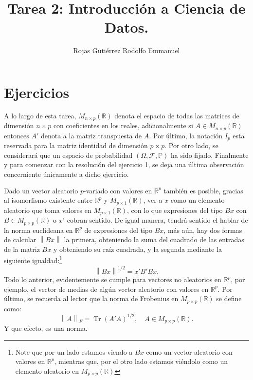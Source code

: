 \documentclass[10.5pt,notitlepage]{article}
\title{Tarea 2: Introducción a Ciencia de Datos.}
\author{Rojas Gutiérrez Rodolfo Emmanuel}
\renewcommand{\qedsymbol}{$\blacksquare$}
\DeclareMathOperator{\Tr}{Tr}
\newcommand{\PP}{\mathbb{P}}
\newcommand{\RR}{\mathbb{R}}
\newcommand{\Ff}{\mathcal{F}}
\newcommand{\norm}[1]{\left\| #1 \right\|}
\theoremstyle{plain}
\newenvironment{rem}
  {\pushQED{\qed}\renewcommand{\qedsymbol}{$\triangle$}\remarkex}
  {\popQED\endremarkex}
\begin{document}
\maketitle

\section{Ejercicios}
A lo largo de esta tarea, \(M_{n\times p}(\RR)\) denota el espacio de todas las matrices de dimensión \(n\times p\) con coeficientes en los reales, adicionalmente si \(A \in M_{n\times p}(\RR)\) entonces \(A'\) denota a la matriz transpuesta de \(A\). Por último, la notación \(I_p\) esta reservada para la matriz identidad de dimensión \(p\times p\). Por otro lado, se considerará que un espacio de probabilidad \((\Omega, \Ff, \PP)\) ha sido fijado. Finalmente y para comenzar con la resolución del ejercicio 1, se deja una última observación concerniente únicamente a dicho ejercicio.

\begin{rem}[Ejercicio 1]\label{rem1}
Dado un vector aleatorio \(p\)-variado con valores en \(\RR^{p}\) también es posible, gracias al isomorfismo existente entre \(\RR^{p}\) y \(M_{p \times 1}(\RR)\), ver a \(x\) como un elemento aleatorio que toma valores en \(M_{p \times 1}(\RR)\), con lo que expresiones del tipo \(Bx\) con \(B\in M_{p \times p}(\RR)\) o \(x'\) cobran sentido. De igual manera, tendrá sentido el hablar de la norma euclideana en \(\RR^{p}\) de expresiones del tipo \(Bx\), más aún, hay dos formas de calcular \(\norm{Bx}\) la primera, obteniendo la suma del cuadrado de las entradas de la matriz \(Bx\) y obteniendo su raíz cuadrada, y la segunda mediante la siguiente igualdad:\footnote{Note que por un lado estamos viendo a \(Bx\) como un vector aleatorio con valores en \(\RR^p\), mientras que, por el otro lado estamos viéndolo como un elemento aleatorio en \(M_{p \times p }(\RR)\)} 
\[
 \norm{Bx}^{1/2} = x'B'Bx. 
\]
Todo lo anterior, evidentemente se cumple para vectores no aleatorios en \(\RR^{p}\), por ejemplo, el vector de medias de algún vector aleatorio con valores en \(\RR^{p}\). Por último, se recuerda al lector que la norma de Frobenius en \(M_{p\times p }(\RR)\) se define como:
\[
\norm{A}_{F} = \Tr(A'A)^{1/2}, \quad A \in M_{p \times p }(\RR).
\]
Y que efecto, es una norma. 
\end{rem}
\end{document}
